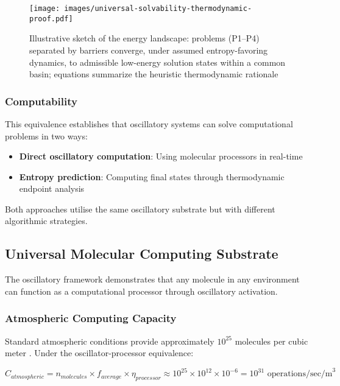 \documentclass[12pt,a4paper]{article}
\begin{document}
\begin{figure}[H]
    \centering
    \texttt{[image: images/universal-solvability-thermodynamic-proof.pdf]}
    \caption{Illustrative sketch of the  energy landscape: problems (P1–P4) separated by barriers converge, under assumed entropy-favoring dynamics, to admissible low-energy solution states within a common basin; equations summarize the heuristic thermodynamic rationale}
    \label{fig:universal_computing}
    \end{figure}

\subsubsection{Computability}

This equivalence establishes that oscillatory systems can solve computational problems in two ways:
\begin{itemize}
\item \textbf{Direct oscillatory computation}: Using molecular processors in real-time
\item \textbf{Entropy prediction}: Computing final states through thermodynamic endpoint analysis
\end{itemize}

Both approaches utilise the same oscillatory substrate but with different algorithmic strategies.

\subsection{Universal Molecular Computing Substrate}

The oscillatory framework demonstrates that any molecule in any environment can function as a computational processor through oscillatory activation.

\subsubsection{Atmospheric Computing Capacity}

Standard atmospheric conditions provide approximately $10^{25}$ molecules per cubic meter \cite{lloyd2000ultimate}. Under the oscillator-processor equivalence:

\begin{equation}
C_{atmospheric} = n_{molecules} \times f_{average} \times \eta_{processor} \approx 10^{25} \times 10^{12} \times 10^{-6} = 10^{31} \text{ operations/sec/m}^3
\end{equation}
\end{document}
